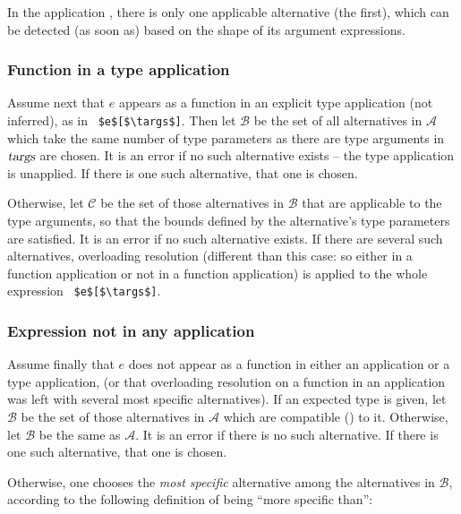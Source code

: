 In the application , there is only one applicable alternative (the first), which can be detected (as soon as) based on the shape of its argument expressions. 






\subsubsection{Function in a type application}

Assume next that $e$ appears as a function in an explicit type application (not inferred), as in ~\lstinline!$e$[$\targs$]!. Then let $\mathcal{B}$ be the set of all alternatives in $\mathcal{A}$ which take the same number of type parameters as there are type arguments in $\mbox{\sl targs}$ are chosen. It is an error if no such alternative exists -- the type application is unapplied. If there is one such alternative, that one is chosen. 

Otherwise, let $\mathcal{C}$ be the set of those alternatives in $\mathcal{B}$ that are applicable to the type arguments, so that the bounds defined by the alternative's type parameters are satisfied. It is an error if no such alternative exists. If there are several such alternatives, overloading resolution (different than this case: so either in a function application or not in a function application) is applied to the whole expression ~\lstinline!$e$[$\targs$]!. 






\subsubsection{Expression not in any application}
\label{sec:overloading-resolution-no-app}

Assume finally that $e$ does not appear as a function in either an application or a type application, (or that overloading resolution on a function in an application was left with several most specific alternatives). If an expected type is given, let $\mathcal{B}$ be the set of those alternatives in $\mathcal{A}$ which are compatible () to it. Otherwise, let $\mathcal{B}$ be the same as $\mathcal{A}$. It is an error if there is no such alternative. If there is one such alternative, that one is chosen. 

Otherwise, one chooses the {\em most specific} alternative among the alternatives in $\mathcal{B}$, according to the following definition of being ``more specific than'':

